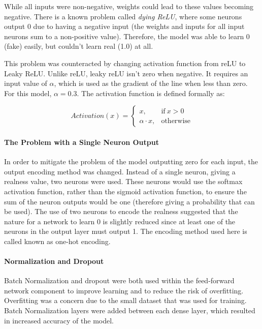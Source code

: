 \documentclass[10pt,a4paper]{article}
\begin{document}
                While all inputs were non-negative, weights could lead to these values becoming negative. There is a known problem called \emph{dying ReLU}, where some neurons output 0
                due to having a negative input (the weights and inputs for all input neurons sum to a non-positive value). Therefore, the model was able to learn 0 (fake) easily, but couldn't learn real (1.0) at all. \cite{liu_liu_2017}

                This problem was counteracted by changing activation function from reLU to Leaky ReLU. Unlike reLU, leaky reLU isn't zero when negative. It requires an input value of $\alpha$, which is used as the gradient of the line when less than zero. \cite{liu_liu_2017} For this model, $\alpha=0.3$. The activation function is defined formally as:
                
                
                \begin{equation}
                    Activation(x) =
                    \begin{cases}
                    x, & \text{if}\ x>0 \\
                    \alpha \cdot x, & \text{otherwise}
                    \end{cases}
                \end{equation}

                \paragraph{The Problem with a Single Neuron Output}
                In order to mitigate the problem of the model outputting zero for each input, the output encoding method was changed. Instead of a single neuron, giving a realness value, two neurons were used.
                These neurons would use the softmax activation function, rather than the sigmoid activation function, to ensure the sum of the neuron outputs would be one (therefore giving a probability that can be used).
                The use of two neurons to encode the realness suggested that the nature for a network to learn 0 is slightly reduced since at least one of the neurons in the output layer must output 1. The encoding method used here
                is called known as one-hot encoding.

                \paragraph{Normalization and Dropout}
                Batch Normalization and dropout were both used within the feed-forward network component to improve learning and to reduce the risk of overfitting. Overfitting was a concern due to the small dataset that was used for training.
                Batch Normalization layers were added between each dense layer, which resulted in increased accuracy of the model.
\end{document}
